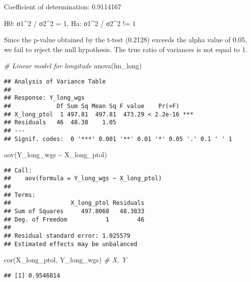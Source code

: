 \documentclass[
]{article}
\newenvironment{Shaded}{\begin{snugshade}}{\end{snugshade}}
\newcommand{\CommentTok}[1]{\textcolor[rgb]{0.56,0.35,0.01}{\textit{#1}}}
\newcommand{\FunctionTok}[1]{\textcolor[rgb]{0.00,0.00,0.00}{#1}}
\newcommand{\NormalTok}[1]{#1}
\newcommand{\SpecialCharTok}[1]{\textcolor[rgb]{0.00,0.00,0.00}{#1}}
\begin{document}
Coefficient of determination: 0.9114167

H0: σ1\^{}2 / σ2\^{}2 = 1, Ha: σ1\^{}2 / σ2\^{}2 != 1

Since the p-value obtained by the t-test (0.2128) exceeds the alpha
value of 0.05, we fail to reject the null hypothesis. The true ratio of
variances is not equal to 1.

\begin{Shaded}
\begin{Highlighting}[]
\CommentTok{\# Linear model for longitude}
\FunctionTok{anova}\NormalTok{(lm\_long)}
\end{Highlighting}
\end{Shaded}

\begin{verbatim}
## Analysis of Variance Table
## 
## Response: Y_long_wgs
##             Df Sum Sq Mean Sq F value    Pr(>F)    
## X_long_ptol  1 497.81  497.81  473.29 < 2.2e-16 ***
## Residuals   46  48.38    1.05                      
## ---
## Signif. codes:  0 '***' 0.001 '**' 0.01 '*' 0.05 '.' 0.1 ' ' 1
\end{verbatim}

\begin{Shaded}
\begin{Highlighting}[]
\FunctionTok{aov}\NormalTok{(Y\_long\_wgs }\SpecialCharTok{\textasciitilde{}}\NormalTok{ X\_long\_ptol)}
\end{Highlighting}
\end{Shaded}

\begin{verbatim}
## Call:
##    aov(formula = Y_long_wgs ~ X_long_ptol)
## 
## Terms:
##                 X_long_ptol Residuals
## Sum of Squares     497.8068   48.3833
## Deg. of Freedom           1        46
## 
## Residual standard error: 1.025579
## Estimated effects may be unbalanced
\end{verbatim}

\begin{Shaded}
\begin{Highlighting}[]
\FunctionTok{cor}\NormalTok{(X\_long\_ptol, Y\_long\_wgs) }\CommentTok{\# X, Y}
\end{Highlighting}
\end{Shaded}

\begin{verbatim}
## [1] 0.9546814
\end{verbatim}

\begin{Shaded}
\end{Shaded}
\end{document}
